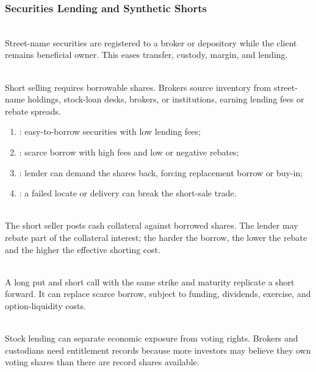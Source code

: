 \subsubsection{Securities Lending and Synthetic Shorts}

\begin{definition} \\
Street-name securities are registered to a broker or depository while the client remains beneficial owner. This eases transfer, custody, margin, and lending.
\end{definition}

\begin{mechanism} \\
Short selling requires borrowable shares. Brokers source inventory from street-name holdings, stock-loan desks, brokers, or institutions, earning lending fees or rebate spreads.
\end{mechanism}

\begin{taxonomy} 
\begin{enumerate}[label=\roman*.]
\setlength{\itemsep}{0pt}
\item {}: easy-to-borrow securities with low lending fees;
\item {}: scarce borrow with high fees and low or negative rebates;
\item {}: lender can demand the shares back, forcing replacement borrow or buy-in;
\item {}: a failed locate or delivery can break the short-sale trade.
\end{enumerate}
\end{taxonomy}

\begin{definition} \\
The short seller posts cash collateral against borrowed shares. The lender may rebate part of the collateral interest; the harder the borrow, the lower the rebate and the higher the effective shorting cost.
\end{definition}

\begin{principle} \\
A long put and short call with the same strike and maturity replicate a short forward. It can replace scarce borrow, subject to funding, dividends, exercise, and option-liquidity costs.
\end{principle}

\begin{caveat} \\
Stock lending can separate economic exposure from voting rights. Brokers and custodians need entitlement records because more investors may believe they own voting shares than there are record shares available.
\end{caveat}
